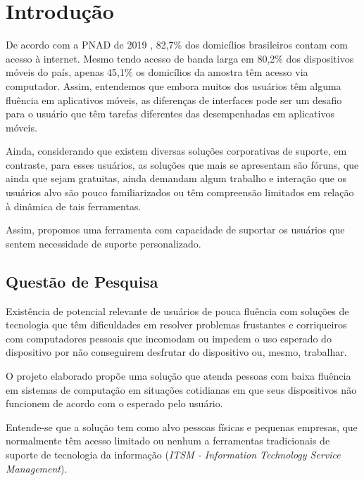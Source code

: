 
\chapter[Introdução]{Introdução}

	De acordo com a PNAD de 2019 \citeauthor{PNAD:2019}, 82,7\% dos domicílios brasileiros contam com acesso à internet. Mesmo tendo acesso de banda larga em 80,2\% dos dispositivos móveis do país, apenas 45,1\% os domicílios da amostra têm acesso via computador. Assim, entendemos que embora muitos dos usuários têm alguma fluência em aplicativos móveis, as diferenças de interfaces pode ser um desafio para o usuário que têm tarefas diferentes das desempenhadas em aplicativos móveis.
	
	Ainda, considerando que existem diversas soluções corporativas de suporte, em contraste, para esses usuários, as soluções que mais se apresentam são fóruns, que ainda que sejam gratuitas, ainda demandam algum trabalho e interação que os usuários alvo são pouco familiarizados ou têm compreensão limitados em relação à dinâmica de tais ferramentas.
	
	Assim, propomos uma ferramenta com capacidade de suportar os usuários que sentem necessidade de suporte personalizado.

	\section[Questão de Pesquisa]{Questão de Pesquisa}
	
		Existência de potencial relevante de usuários de pouca fluência com soluções de tecnologia que têm dificuldades em resolver problemas frustantes e corriqueiros com computadores pessoais que  incomodam ou impedem o uso esperado do dispositivo por não conseguirem desfrutar do dispositivo ou, mesmo, trabalhar.
		
		O projeto elaborado propõe uma solução que atenda pessoas com baixa fluência em sistemas de computação em situações cotidianas em que seus dispositivos não funcionem de acordo com o esperado pelo usuário.
			
		Entende-se que a solução tem como alvo pessoas físicas e pequenas empresas, que normalmente têm acesso limitado ou nenhum a ferramentas tradicionais de suporte de tecnologia da informação (\textit{ITSM - Information Technology Service Management}).
		
